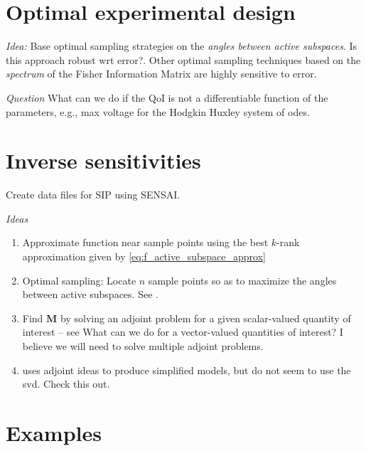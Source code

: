 \documentclass{siamltex}
\newcommand{\Mmat}{\bm{M}}
\begin{document}
\section{Optimal experimental design}
\cite{AP-2002, BHK-2011, CBCL-2009, CH-2008, CBCL-2009, Federov-2010, Pronzato-2008, RWGF-2007}

\emph{Idea:} Base optimal sampling strategies on the \emph{angles between active subspaces}.  Is this approach robust wrt error?. Other optimal sampling techniques based on the \emph{spectrum} of the Fisher Information Matrix are highly sensitive to error. 

\emph{Question} What can we do if the QoI is not a differentiable function of the parameters, e.g., max voltage for the Hodgkin Huxley system of odes.


\section{Inverse sensitivities}
Create data files for SIP using SENSAI.


\bigskip
\noindent\emph{Ideas}
\begin{enumerate}
  \item Approximate function near sample points using the best $k$-rank approximation given by \eqref{eq:f_active_subspace_approx}
  \item Optimal sampling: Locate $n$ sample points so as to maximize the angles between active subspaces. See \cite{BG-1973}.
  \item Find $\Mmat$ by solving an adjoint problem for a given scalar-valued quantity of interest -- see \cite{PLCS-2006} What can we do for a vector-valued quantities of interest? I believe we will need to solve multiple adjoint problems.
  \item \cite{MW-2014} uses adjoint ideas to produce simplified models, but do not seem to use the svd. Check this out.
\end{enumerate}


\section{Examples}
\end{document}
